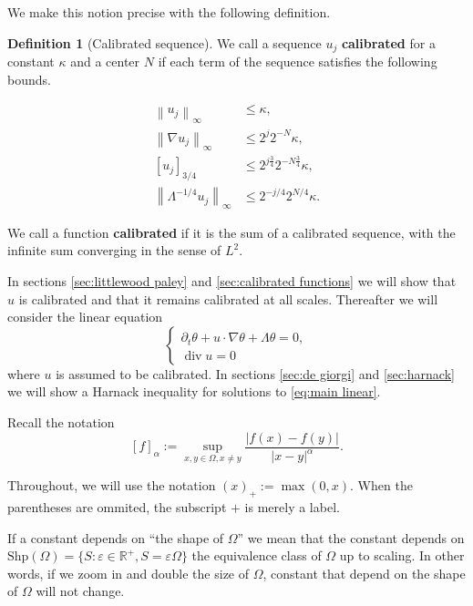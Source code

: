 \documentclass[11pt]{amsart}
\theoremstyle{remark}
\theoremstyle{definition}
\newtheorem{definition}{Definition}
\newcommand{\R}{\mathbb{R}}
\newcommand{\eps}{\varepsilon}
\newcommand{\norm}[1]{\left\lVert#1\right\rVert}
\newcommand{\bracket}[1]{\left[ #1 \right]}
\newcommand{\del}{\partial}
\newcommand{\grad}{\nabla}
\renewcommand{\div}{\operatorname{div}}
\begin{document}
We make this notion precise with the following definition.  

\begin{definition}[Calibrated sequence]
We call a sequence $u_j$ \textbf{calibrated} for a constant $\kappa$ and a center $N$ if each term of the sequence satisfies the following bounds.  

\begin{align*}
\norm{u_j}_\infty &\leq \kappa, \\
\norm{\grad u_j}_\infty &\leq 2^{j} 2^{-N} \kappa, \\
\bracket{u_j}_{3/4} &\leq 2^{j \frac{3}{4}} 2^{- N \frac{3}{4}} \kappa, \\
\norm{\Lambda^{-1/4} u_j}_\infty &\leq 2^{-j/4} 2^{N/4} \kappa.  
\end{align*} 

We call a function \textbf{calibrated} if it is the sum of a calibrated sequence, with the infinite sum converging in the sense of $L^2$.  

\end{definition}

In sections \ref{sec:littlewood paley} and \ref{sec:calibrated functions} we will show that $u$ is calibrated and that it remains calibrated at all scales.  Thereafter we will consider the linear equation
\begin{equation} \label{eq:main linear} \begin{cases}
\del_t \theta + u \cdot \grad \theta + \Lambda \theta = 0, \\
\div u = 0
\end{cases} \end{equation}
where $u$ is assumed to be calibrated.  In sections \ref{sec:de giorgi} and \ref{sec:harnack} we will show a Harnack inequality for solutions to \eqref{eq:main linear}.  

Recall the notation
\[ \bracket{f}_\alpha := \sup_{x,y \in \Omega, x \neq y} \frac{|f(x)-f(y)|}{|x-y|^\alpha}. \]

Throughout, we will use the notation $(x)_+ := \max(0,x)$.  When the parentheses are ommited, the subscript $+$ is merely a label.  

\newcommand{\shape}[1]{\text{Shp}(#1)}

If a constant depends on ``the shape of $\Omega$'' we mean that the constant depends on $\shape{\Omega} = \{S: \eps \in \R^+, S = \eps \Omega \}$ the equivalence class of $\Omega$ up to scaling.  In other words, if we zoom in and double the size of $\Omega$, constant that depend on the shape of $\Omega$ will  not change.  
\end{document}
